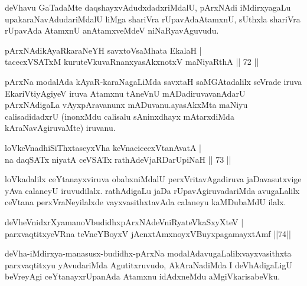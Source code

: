 \begin{artha}
deVhavu GaTadaMte daqshayxvAdudxdadxriMdalU, pArxNAdi iMdirxyagaLu upakaraNavAdudariMdalU liMga shariVra rUpavAda\break AtamxnU, sUthxla shariVra rUpavAda AtamxnU anAtamxveMdeV niNaRyavAguvudu.
\end{artha}


\begin{shl}
pArxNAdikAyaRkaraNeYH savxtoV\s saMhata EkalaH |\\
tacecxVSATxM kuruteV\s kuvaRnanxyasAkxnotxV maNiyaRthA \hfill || 72 ||
\end{shl}	

\begin{artha}
pArxNa modalAda kAyaR-karaNagaLiMda  savxtaH saMGAtadalilx seVrade iruva EkariVtiyAgiyeV iruva Atamxnu tAneVnU mADadiruvavanAdarU pArxNAdigaLa vAyxpAravanunx mADuvanu.\break ayasAkxMta maNiyu calisadidadxrU (inonxMdu calisalu sAninxdhayx mAtarxdiMda kAraNavAgiruvaMte) iruvanu.
\end{artha}


\begin{shl}
loVkeV\s nadhiSiThxtaseyxVha keVnacicecxVtanAvatA |\\
na daqSATx niyatA ceVSATx rathAdeVjaRDarUpiNaH \hfill || 73 ||
\end{shl}

\begin{artha}
loVkadalilx ceYtanayxviruva obabxniMdalU perxVritavAgadiruva jaDavasutxvige yAva calaneyU iruvudilalx. rathAdigaLu jaDa rUpavAgiruvadariMda avugaLalilx ceVtana perxVraNeyilalxde vayxvasithxtavAda calaneyu kaMDubaMdU ilalx.
\end{artha}%

\begin{shl}
deVheVnidxrXyamanoVbudidhxpArxNAdeVniRyateVkaSxyXteV |\\
parxvaqtitxyeVRna teVneYBoyxV jAcnxtAmx\s noyxV\s BuyxpagamayxtAmf \hfill ||74||
\end{shl}

\begin{artha}
deVha-iMdirxya-manasusx-budidhx-pArxNa modalAdavugaLalilx\break vayxvasithxta parxvaqtitxyu yAvudariMda Agutitxruvudo, AkAraNadiMda I deVhAdigaLigU beVreyAgi ceYtanayxrUpanAda Atamxnu idAdxneMdu aMgiVkarisabeVku.
\end{artha}

